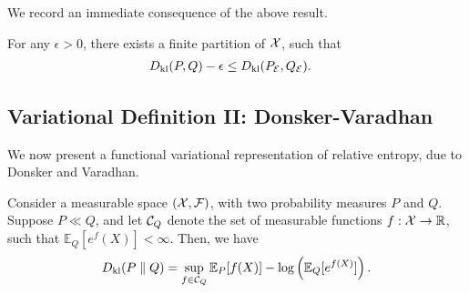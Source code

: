             We record an immediate consequence of the above result. 
            \begin{corollary}
                For any $\epsilon >0$, there exists a finite partition of $\mathcal{X}$, such that 
                \begin{align}
                    &D_{\text{kl}}(P, Q) - \epsilon \leq D_{\text{kl}}(P_{\mathcal{E}}, Q_{\mathcal{E}}). 
                \end{align}
            \end{corollary}
            
        \subsection{Variational Definition II: Donsker-Varadhan} 

            We now present a functional variational representation of relative entropy, due to Donsker and Varadhan. 
            \begin{theorem}
                \label{thm:donsker-varadhan}
                Consider a measurable space $(\mathcal{X}, \mathcal{F})$, with two probability measures $P$ and $Q$. Suppose $P \ll Q$, and let $\mathcal{C}_Q$ denote the set of measurable functions $f: \mathcal{X} \to \mathbb{R}$, such that $\mathbb{E}_Q[e^f(X)]< \infty$. Then, we have 
                \begin{align}
                    D_{\text{kl}}(P\parallel Q) = \sup_{f \in \mathcal{C}_Q} \mathbb{E}_P[f(X)] - \log \left(  \mathbb{E}_Q[e^{f(X)}]\right). 
                \end{align}
            \end{theorem}


